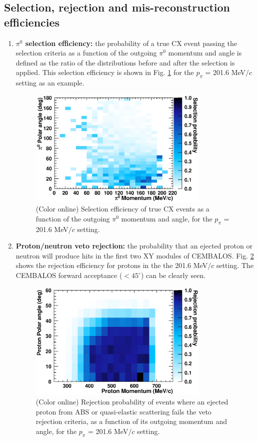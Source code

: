 {\subsection{Selection, rejection and mis-reconstruction efficiencies}\label{sec:efficiencies}

\begin{enumerate}
\item{{\bf $\pi^0$ selection efficiency:} the probability of a true CX event passing the selection criteria as a function of the outgoing $\pi^0$ momentum and angle is defined as the ratio of the distributions before and after the selection is applied. This selection efficiency is shown in Fig. \ref{fig:pi0_selection} for the $p_{\pi}$ = 201.6 MeV$/c$ setting as an example.}

\begin{figure}[h]
 \includegraphics[width=86mm]{figures/Pi0SelectionEfficiency_200.eps}
 \caption{(Color online) Selection efficiency of true CX events as a function of the outgoing $\pi^{0}$ momentum and angle, for the $p_{\pi}$ = 201.6 MeV$/c$ setting.}
 \label{fig:pi0_selection}
\end{figure}

\item{{\bf Proton/neutron veto rejection:} the probability that an ejected proton or neutron will produce hits in the first two XY modules of CEMBALOS. Fig. \ref{fig:proton_rejection} shows the rejection efficiency for protons in the the 201.6 MeV$/c$ setting. The CEMBALOS forward acceptance ($<45^{\circ}$) can be clearly seen.}

\begin{figure}[h]
 \includegraphics[width=86mm]{figures/ProtonRejectionEfficiency_200.eps}
 \caption{(Color online) Rejection probability of events where an ejected proton from ABS or quasi-elastic scattering fails the veto rejection criteria, as a function of its outgoing  momentum and angle, for the $p_{\pi}$ = 201.6 MeV$/c$ setting.}
 \label{fig:proton_rejection}
\end{figure}


\end{enumerate}}
